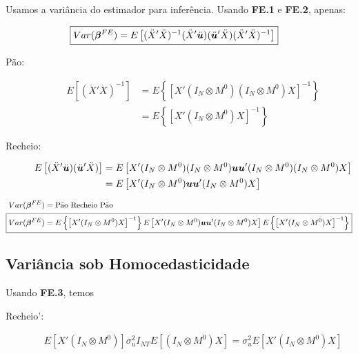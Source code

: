 \documentclass[11pt,oneside,a4paper]{article}
\numberwithin{equation}{section}
\begin{document}
\begin{description}
Usamos a variância do estimador para inferência.
Usando \textbf{FE.1} e \textbf{FE.2}, apenas:

\vspace{-1 em}
\begin{align*} 
	\Aboxed{
Var( \mbs{\beta}^{FE} ) = 
E \left[
( \ddot{X}' \ddot{X} )^{-1}
(\ddot{X}' \ddot{\mbs{u}}) (\ddot{\mbs{u}}' \ddot{X} )
( \ddot{X}' \ddot{X} )^{-1} 
\right]}
\end{align*}


\begin{description}
\item [Pão:]
\begin{align*}
E\left[ ( \ddot{X}' \ddot{X} )^{-1} \right] &=
E \left\{ \left[
X' ( I_{N} \otimes M^{0} ) ( I_{N} \otimes M^{0} ) X
\right]^{-1} \right\}
\\ &=
E \left\{ \left[
X' ( I_{N} \otimes M^{0} ) X
\right]^{-1} \right\}
\end{align*}

\item [Recheio:]
\begin{align*}
E\left[
(\ddot{X}' \ddot{\boldsymbol{u}}) (\ddot{\boldsymbol{u}}' \ddot{X} ) 
\right] 
&=
E \left[
X' ( I_{N} \otimes M^{0} ) ( I_{N} \otimes M^{0} ) 
\boldsymbol{u} \boldsymbol{u}'
( I_{N} \otimes M^{0} ) ( I_{N} \otimes M^{0} ) X
\right]
\\ &=
E \left[
X' ( I_{N} \otimes M^{0} ) \boldsymbol{u} \boldsymbol{u}' ( I_{N} \otimes M^{0} ) X
\right]
\end{align*}
\end{description}

\vspace{-1 em}
\begin{align*} 
Var( \mbs{\beta}^{FE} ) &= \text{Pão Recheio Pão}
\\ 
\Aboxed{
Var( \mbs{\beta}^{FE} ) &= 
E \left\{ \left[
X' ( I_{N} \otimes M^{0} ) X
\right]^{-1} \right\}
E \left[
X' ( I_{N} \otimes M^{0} ) \mbs{u} \mbs{u}' ( I_{N} \otimes M^{0} ) X
\right]
E \left\{ \left[
X' ( I_{N} \otimes M^{0} ) X
\right]^{-1} \right\}
}
\end{align*}

\subsection*{Variância sob Homocedasticidade}

Usando \textbf{FE.3}, temos

\begin{description}
\item [Recheio':]
\begin{align*}
E \left[ X' ( I_{N} \otimes M^{0} ) \right]
\sigma^2_{u} I_{NT}
E \left[ ( I_{N} \otimes M^{0} ) X \right]
=
\sigma^2_{u}
E \left[ X' ( I_{N} \otimes M^{0} ) X \right]
\end{align*}
\end{description}


\end{description}
\end{document}
